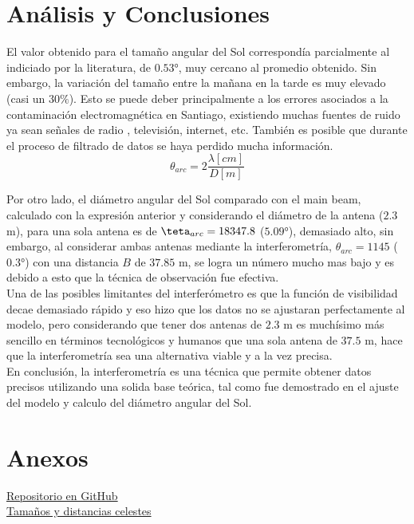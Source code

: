 \documentclass[letterpaper,oneside]{article}
\begin{document}
\section{Análisis y Conclusiones}
El valor obtenido para el tamaño angular del Sol correspondía parcialmente al indiciado por la literatura, de $0.53°$, muy cercano al promedio obtenido. Sin embargo, la variación del tamaño entre la mañana en la tarde es muy elevado (casi un $30\%$). Esto se puede deber principalmente a los errores asociados a la contaminación electromagnética en Santiago, existiendo muchas fuentes de ruido ya sean señales de radio , televisión, internet, etc. También es posible que durante el proceso de filtrado de datos se haya perdido mucha información.\\

$$\theta_{arc} = 2 \frac{\lambda [cm]}{D [m]}$$

Por otro lado, el diámetro angular del Sol comparado con el main beam, calculado con la expresión anterior y considerando el diámetro de la antena ($2.3$ m), para una sola antena es de $\teta_{arc} = 18347.8$ ($5.09°$), demasiado alto, sin embargo, al considerar ambas antenas mediante la interferometría, $\theta_{arc} = 1145$ ($0.3°$) con una distancia $B$ de $37.85$ m, se logra un número mucho mas bajo y es debido a esto que la técnica de observación fue efectiva.\\

Una de las posibles limitantes del interferómetro es que la función de visibilidad decae demasiado rápido y eso hizo que los datos no se ajustaran perfectamente al modelo, pero considerando que tener dos antenas de $2.3$ m es muchísimo más sencillo en términos tecnológicos y humanos que una sola antena de $37.5$ m, hace que la interferometría sea una alternativa viable y a la vez precisa.\\

En conclusión, la interferometría es una técnica que permite obtener datos precisos utilizando una solida base teórica, tal como fue demostrado en el ajuste del modelo y calculo del diámetro angular del Sol.\\
 
\section{Anexos}
\href{https://github.com/vecheto/astro_experimental/tree/main/Tarea\%204}{Repositorio en GitHub}\\
\href{https://www.matem.unam.mx/~barot/clases/2012-2/24medicion.pdf}{Tamaños y distancias celestes}\\
\end{document}
